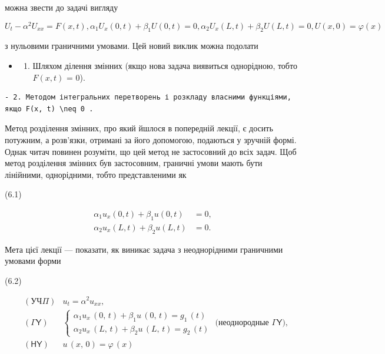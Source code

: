 \documentclass[
  ukrainian,
]{article}
\providecommand{\tightlist}{%
  \setlength{\itemsep}{0pt}\setlength{\parskip}{0pt}}
\begin{document}
можна звести до задачі вигляду

\[
U_{t} - \alpha^{2}U_{xx} = F(x, t),
\alpha_{1}U_{x}(0, t) + \beta_{1}U(0, t) = 0,
\alpha_{2}U_{x}(L, t) + \beta_{2}U(L, t) = 0,
U(x, 0) = \varphi(x)
\]

з нульовими граничними умовами. Цей новий виклик можна подолати

\begin{itemize}
\tightlist
\item
  \begin{enumerate}
  \def\labelenumi{\arabic{enumi}.}
  \tightlist
  \item
    Шляхом ділення змінних (якщо нова задача виявиться однорідною, тобто
    \(F(x, t)\) = 0).
  \end{enumerate}
\end{itemize}

\begin{verbatim}
- 2. Методом інтегральних перетворень і розкладу власними функціями, якщо F(x, t) \neq 0 .
\end{verbatim}

Метод розділення змінних, про який йшлося в попередній лекції, є досить
потужним, а розв'язки, отримані за його допомогою, подаються у зручній
формі. Однак читач повинен розуміти, що цей метод не застосовний до всіх
задач. Щоб метод розділення змінних був застосовним, граничні умови
мають бути лінійними, однорідними, тобто представленими як

(6.1)

\[
\begin{aligned} \alpha_1 u_x(0, t) + \beta_1 u(0, t) &= 0, \\ \alpha_2 u_x(L, t) + \beta_2 u(L, t) &= 0. \end{aligned}
\]

Мета цієї лекції --- показати, як виникає задача з неоднорідними
граничними умовами форми

(6.2)

\[
\begin{aligned} & (\mathsf{У}\mathsf{Ч}\Pi) & u_t = \alpha^2 u_{xx}, \\ & (\mathsf{\Gamma}\mathsf{Y}) & \begin{cases} \alpha_1 u_x \, (0, \, t) + \beta_1 u \, (0, \, t) = g_1 \, (t) \\ \alpha_2 u_x \, (L, \, t) + \beta_2 u \, (L, \, t) = g_2 \, (t) \end{cases} \text{ (неоднородные } \mathsf{\Gamma}\mathsf{Y}), \\ & (\mathsf{H}\mathsf{Y}) & u \, (x, \, 0) = \varphi \, (x) \end{aligned}
\]
\end{document}
